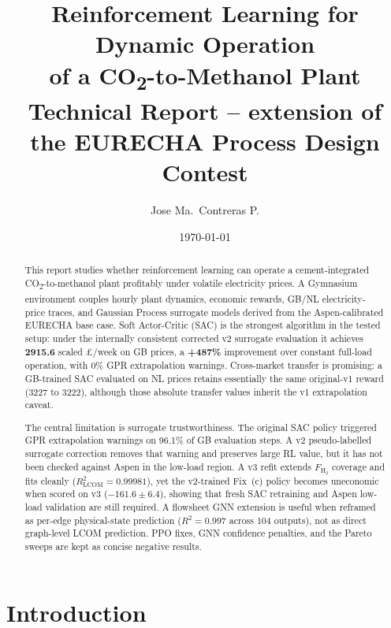 \documentclass[11pt,a4paper]{article}
\title{%
  \vspace{-1.5cm}
  \textbf{Reinforcement Learning for Dynamic Operation\\
  of a CO\textsubscript{2}-to-Methanol Plant}\\[6pt]
  \large Technical Report -- extension of the EURECHA Process Design Contest
}
\author{Jose Ma.\ Contreras P.}
\date{\today}
\begin{document}
\maketitle
\thispagestyle{fancy}

\begin{abstract}
\noindent
This report studies whether reinforcement learning can operate a
cement-integrated CO\textsubscript{2}-to-methanol plant profitably under
volatile electricity prices. A Gymnasium environment couples hourly plant
dynamics, economic rewards, GB/NL electricity-price traces, and Gaussian
Process surrogate models derived from the Aspen-calibrated EURECHA base case.
Soft Actor-Critic (SAC) is the strongest algorithm in the tested setup:
under the internally consistent corrected v2 surrogate evaluation it achieves
\textbf{2915.6} scaled \pounds/week on GB prices, a \textbf{+487\%} improvement
over constant full-load operation, with 0\% GPR extrapolation warnings.
Cross-market transfer is promising: a GB-trained SAC evaluated on NL prices
retains essentially the same original-v1 reward (3227 to 3222), although those
absolute transfer values inherit the v1 extrapolation caveat.

The central limitation is surrogate trustworthiness. The original SAC policy
triggered GPR extrapolation warnings on 96.1\% of GB evaluation steps. A v2
pseudo-labelled surrogate correction removes that warning and preserves large
RL value, but it has not been checked against Aspen in the low-load region. A v3 refit
extends $F_{\mathrm{H}_2}$ coverage and fits cleanly ($R^2_{\mathrm{LCOM}} =
0.99981$), yet the v2-trained Fix~(c) policy becomes uneconomic when scored on
v3 ($-161.6 \pm 6.4$), showing that fresh SAC retraining and Aspen low-load
validation are still required. A flowsheet GNN extension is useful when
reframed as per-edge physical-state prediction ($R^2 = 0.997$ across 104
outputs), not as direct graph-level LCOM prediction. PPO fixes, GNN confidence
penalties, and the Pareto sweeps are kept as concise negative results.
\end{abstract}

\vspace{0.3cm}

\section{Introduction}
\end{document}

